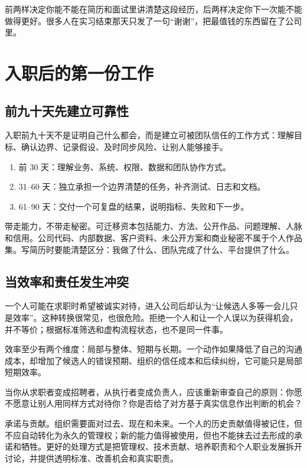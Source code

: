\documentclass[UTF8,zihao=5,openany]{ctexbook}
\begin{document}
前两样决定你能不能在简历和面试里讲清楚这段经历，后两样决定你下一次能不能做得更好。很多人在实习结束那天只发了一句“谢谢”，把最值钱的东西留在了公司里。


\section{入职后的第一份工作}
\subsection{前九十天先建立可靠性}
入职前九十天不是证明自己什么都会，而是建立可被团队信任的工作方式：理解目标、确认边界、记录假设、及时同步风险、让别人能够接手。

\begin{enumerate}
\item 前 30 天：理解业务、系统、权限、数据和团队协作方式。
\item 31--60 天：独立承担一个边界清楚的任务，补齐测试、日志和文档。
\item 61--90 天：交付一个可复盘的结果，说明指标、失败和下一步。
\end{enumerate}

带走能力，不带走秘密。可迁移资本包括能力、方法、公开作品、问题理解、人脉和信用。公司代码、内部数据、客户资料、未公开方案和商业秘密不属于个人作品集。写简历时要能清楚区分：我做了什么、团队完成了什么、平台提供了什么。

\subsection{当效率和责任发生冲突}
一个人可能在求职时希望被诚实对待，进入公司后却认为“让候选人多等一会儿只是效率”。这种转换很常见，也很危险。拒绝一个人和让一个人误以为获得机会，并不等价；根据标准筛选和虚构流程状态，也不是同一件事。

效率至少有两个维度：局部与整体、短期与长期。一个动作如果降低了自己的沟通成本，却增加了候选人的错误预期、组织的信任成本和后续纠纷，它可能只是局部短期效率。

\begin{warningbox}
当你从求职者变成招聘者，从执行者变成负责人，应该重新审查自己的原则：你愿不愿意让别人用同样方式对待你？你是否给了对方基于真实信息作出判断的机会？
\end{warningbox}

承诺与贡献。组织需要面对过去、现在和未来。一个人的历史贡献值得被记住，但不应自动转化为永久的管理权；新的能力值得被使用，但也不能抹去过去形成的承诺和牺牲。更好的处理方式是把管理权、技术贡献、培养职责和个人职业发展拆开讨论，并提供透明标准、改善机会和真实职责。
\end{document}

